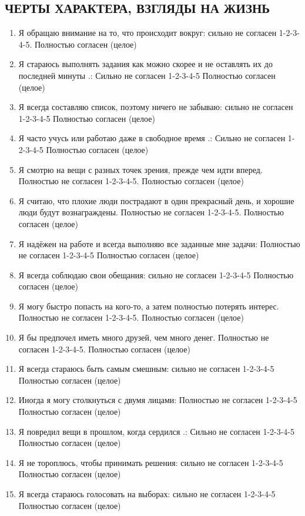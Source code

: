 \documentclass[11pt]{article}
\begin{document}
\subsection{ЧЕРТЫ ХАРАКТЕРА, ВЗГЛЯДЫ НА ЖИЗНЬ}
\begin{enumerate}
\item Я обращаю внимание на то, что происходит вокруг: сильно не согласен 1-2-3-4-5. Полностью согласен (целое)
\item Я стараюсь выполнять задания как можно скорее и не оставлять их до последней минуты .: Сильно не согласен 1-2-3-4-5 Полностью согласен (целое)
\item Я всегда составляю список, поэтому ничего не забываю: сильно не согласен 1-2-3-4-5 Полностью согласен (целое)
\item Я часто учусь или работаю даже в свободное время .: Сильно не согласен 1-2-3-4-5 Полностью согласен (целое)
\item Я смотрю на вещи с разных точек зрения, прежде чем идти вперед. Полностью не согласен 1-2-3-4-5. Полностью согласен (целое)
\item Я считаю, что плохие люди пострадают в один прекрасный день, и хорошие люди будут вознаграждены. Полностью не согласен 1-2-3-4-5. Полностью согласен (целое)
\item Я надёжен на работе и всегда выполняю все заданные мне задачи: Полностью не согласен 1-2-3-4-5 Полностью согласен (целое)
\item Я всегда соблюдаю свои обещания: сильно не согласен 1-2-3-4-5 Полностью согласен (целое)
\item Я могу быстро попасть на кого-то, а затем полностью потерять интерес. Полностью не согласен 1-2-3-4-5. Полностью согласен (целое)
\item Я бы предпочел иметь много друзей, чем много денег. Полностью не согласен 1-2-3-4-5. Полностью согласен (целое)
\item Я всегда стараюсь быть самым смешным: сильно не согласен 1-2-3-4-5 Полностью согласен (целое)
\item Иногда я могу столкнуться с двумя лицами: Полностью не согласен 1-2-3-4-5 Полностью согласен (целое)
\item Я повредил вещи в прошлом, когда сердился .: Сильно не согласен 1-2-3-4-5 Полностью согласен (целое)
\item Я не тороплюсь, чтобы принимать решения: сильно не согласен 1-2-3-4-5 Полностью согласен (целое)
\item Я всегда стараюсь голосовать на выборах: сильно не согласен 1-2-3-4-5 Полностью согласен (целое)

\end{enumerate}
\end{document}
